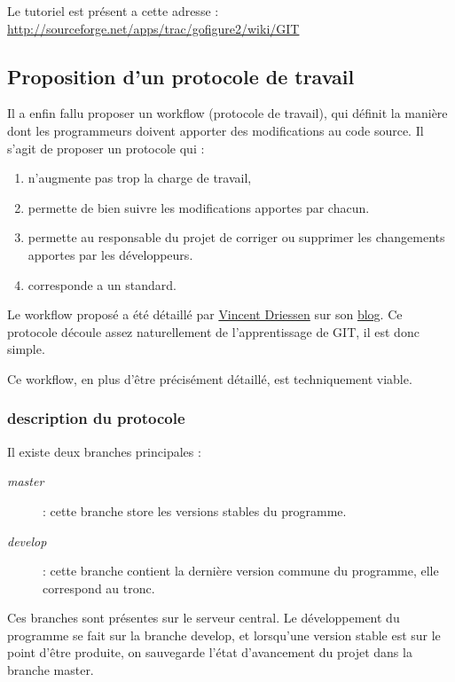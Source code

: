 Le tutoriel est présent a cette adresse : \\
\url{http://sourceforge.net/apps/trac/gofigure2/wiki/GIT}

\subsection{Proposition d'un protocole de travail}
Il a enfin fallu proposer un workflow (protocole de travail), qui définit la manière dont les programmeurs
doivent apporter des modifications au code source. Il s'agit de proposer un protocole qui :
\begin{enumerate}
  \item n'augmente pas trop la charge de travail,
  \item permette de bien suivre les modifications apportes par chacun. 
  \item permette au responsable du projet de corriger ou supprimer les changements apportes par les développeurs.
  \item corresponde a un standard.
\end{enumerate}
Le workflow proposé a été détaillé par \href{http://nvie.com/about }{Vincent Driessen} sur son \href{http://nvie.com/git-model}{blog}. Ce protocole découle assez naturellement de l'apprentissage de GIT, il est donc simple.

Ce workflow, en plus d'être précisément détaillé, est techniquement viable.

\subsubsection{description du protocole}

Il existe deux branches principales : 
\begin{description}
  \item[\emph{master}] : cette branche store les versions stables du programme.
  \item[\emph{develop}] : cette branche contient la dernière version commune du programme, elle correspond au tronc.
\end{description}
Ces branches sont présentes sur le serveur central. Le développement du programme se fait sur la branche develop, et lorsqu'une version stable est sur le point d'être produite, on sauvegarde l'état d'avancement du projet dans la branche master.

